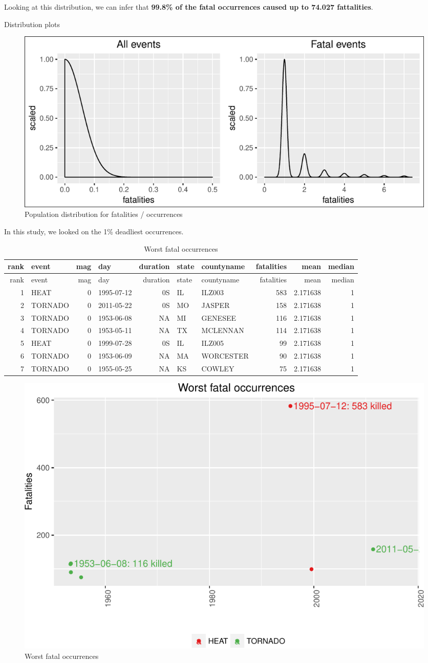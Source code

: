 \documentclass[]{article}
\begin{document}
Looking at this distribution, we can infer that \textbf{99.8\% of the
fatal occurrences caused up to 74.027 fattalities}.

Distribution plots

\begin{figure}[h!]
\centering
\includegraphics{readme_files/figure-latex/fatal-distr-4-1.pdf}
\caption{Population distribution for fatalities / occurrences}
\end{figure}

In this study, we looked on the 1\% deadliest occurrences.

\begin{longtable}[]{@{}rlrlrllrrr@{}}
\caption{Worst fatal occurrences}\tabularnewline
\toprule
rank & event & mag & day & duration & state & countyname & fatalities &
mean & median\tabularnewline
\midrule
\endfirsthead
\toprule
rank & event & mag & day & duration & state & countyname & fatalities &
mean & median\tabularnewline
\midrule
\endhead
1 & HEAT & 0 & 1995-07-12 & 0S & IL & ILZ003 & 583 & 2.171638 &
1\tabularnewline
2 & TORNADO & 0 & 2011-05-22 & 0S & MO & JASPER & 158 & 2.171638 &
1\tabularnewline
3 & TORNADO & 0 & 1953-06-08 & NA & MI & GENESEE & 116 & 2.171638 &
1\tabularnewline
4 & TORNADO & 0 & 1953-05-11 & NA & TX & MCLENNAN & 114 & 2.171638 &
1\tabularnewline
5 & HEAT & 0 & 1999-07-28 & 0S & IL & ILZ005 & 99 & 2.171638 &
1\tabularnewline
6 & TORNADO & 0 & 1953-06-09 & NA & MA & WORCESTER & 90 & 2.171638 &
1\tabularnewline
7 & TORNADO & 0 & 1955-05-25 & NA & KS & COWLEY & 75 & 2.171638 &
1\tabularnewline
\bottomrule
\end{longtable}

\begin{figure}[h!]
\centering
\includegraphics{readme_files/figure-latex/fatal-plot-single-1.pdf}
\caption{Worst fatal occurrences}
\end{figure}
\end{document}
